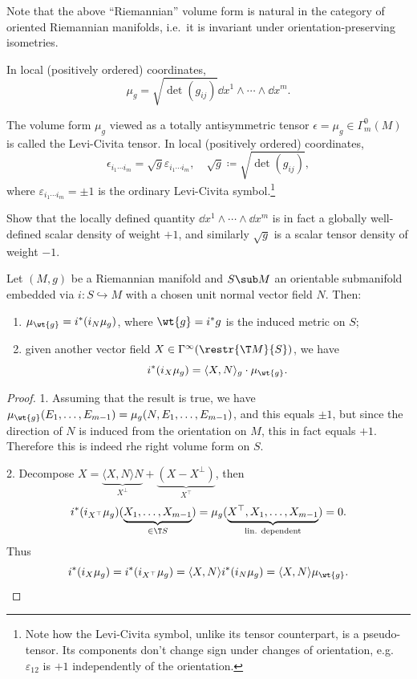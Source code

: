 Note that the above ``Riemannian'' volume form is natural in the category of oriented Riemannian manifolds, i.e.\ it is invariant under orientation-preserving isometries.

In local (positively ordered) coordinates, \[\mu_g=\sqrt{\det(g_{ij})}\dd x^1\wedge\cdots\wedge \dd x^m.\]

\begin{defn}
    The volume form $\mu_g$ viewed as a totally antisymmetric tensor $\epsilon=\mu_g\in\Gamma^0_m(M)$ is called the Levi-Civita tensor. In local (positively ordered) coordinates,
    \[\epsilon_{i_1\cdots i_m}=\sqrt g\varepsilon_{i_1\cdots i_m},\quad \sqrt g\coloneqq\sqrt{\det(g_{ij})},\]
    where $\varepsilon_{i_1\cdots i_m}=\pm 1$ is the ordinary Levi-Civita symbol.\footnote{Note how the Levi-Civita symbol, unlike its tensor counterpart, is a pseudo-tensor. Its components don't change sign under changes of orientation, e.g. $\varepsilon_{12}$ is $+1$ independently of the orientation.}
\end{defn}

\begin{xca}
    Show that the locally defined quantity $\dd x^1\wedge\cdots \wedge\dd x^m$ is in fact a globally well-defined scalar density of weight $+1$, and similarly  $\sqrt{g}$ is a scalar tensor density of weight $-1$.
\end{xca}

\begin{prop}
    Let $(M,g)$ be a Riemannian manifold and $S\sub M$ an orientable submanifold embedded via $i:S\hookrightarrow M$ with a chosen unit normal vector field $N$. Then:
    \begin{enumerate}
        \item $\mu_{\wt{g}}=i^\ast (i_N \mu_g)$, where $\wt{g}=i^\ast g$ is the induced metric on $S$;
        \item given another vector field $X\in\Gamma^\infty(\restr{\T M}{S})$, we have 
        \[i^\ast(i_X\mu_g)=\langle X,N\rangle_g \cdot \mu_{\wt{g}}.\]
    \end{enumerate}
\end{prop}
\begin{proof}
        1. Assuming that the result is true, we have $\mu_{\wt{g}}(E_1,\ldots,E_{m-1})=\mu_g(N,E_1,\ldots,E_{m-1})$, and this equals $\pm 1$, but since the direction of $N$ is induced from the orientation on $M$, this in fact equals $+1$. Therefore this is indeed rhe right volume form on $S$.
        
        2. Decompose $X=\underbrace{\langle X,N\rangle N}_{X^\perp}+\underbrace{(X-X^\perp)}_{X^\top}$,
        then 
        \[i^\ast(i_{X^\top}\mu_g)(\underbrace{X_1,\ldots,X_{m-1}}_{\in \T S})=\mu_g(\underbrace{X^\top,X_1,\ldots,X_{m-1}}_{\text{lin. dependent}})=0.\]
        Thus 
        \[i^\ast(i_X\mu_g)=i^\ast(i_{X^\top}\mu_g)=\langle X,N \rangle i^\ast (i_N \mu_g)=\langle X,N\rangle \mu_{\wt{g}}.\]
\end{proof}


